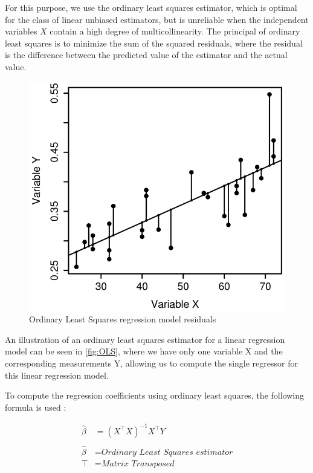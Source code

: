 For this purpose, we use the ordinary least squares estimator, which is optimal for the class of linear unbiased estimators, 
but is unreliable when the independent variables $X$ contain a high degree of multicollinearity.
The principal of ordinary least squares is to minimize the sum of the squared residuals, where the residual is the difference between
the predicted value of the estimator and the actual value. \cite{Linear-Regression}


\begin{figure}[H]
    \centering
    \includegraphics[scale=0.3]{gfx/OLS.png}
    \caption[Ordinary Least Squares regression model residuals]
    {Ordinary Least Squares regression model residuals
    \footnotemark}
    \label{fig:OLS}
\end{figure}

An illustration of an ordinary least squares estimator for a linear regression model can be seen in \autoref{fig:OLS}, where we have only one variable 
X and the corresponding measurements Y, allowing us to compute the single regressor for this linear regression model.

To compute the regression coefficients using ordinary least squares, the following formula is used \cite{Linear-Regression}:

\begin{align}
    \hat{\beta} &=  (\textit{X}^{\top } \textit{X} )^{-1}\textit{X}^{\top} Y \\ \nonumber \\\nonumber
    \hat{\beta} &= \textit{Ordinary Least Squares estimator}\\\nonumber
    \top &= \textit{Matrix Transposed}\nonumber
\end{align}\label{equ:ols}

